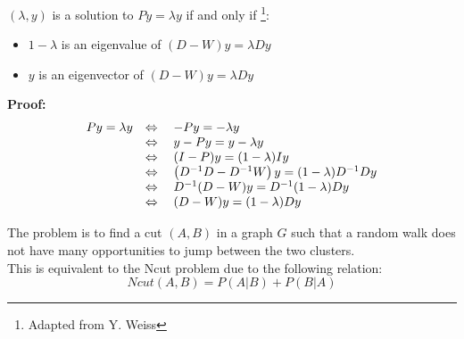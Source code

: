 \begin{thm} $(\lambda, y)$ is a solution to $Py = \lambda y$ if and only if \footnote{Adapted from Y. Weiss}:
	\begin{itemize}
		\item $1-\lambda$ is an eigenvalue of $(D-W)y = \lambda D y$
		\item $y$ is an eigenvector of $(D-W)y = \lambda Dy$
	\end{itemize} 
	\textbf{Proof:}
	$$\begin{array} { l l } { P y = \lambda y } & { \Leftrightarrow \quad - P y = - \lambda y } \\
	{ } & { \Leftrightarrow \quad y - P y = y - \lambda y } \\
	{ } & { \Leftrightarrow \quad ( I - P ) y = ( 1 - \lambda ) I y } \\
	{ } & { \Leftrightarrow \quad \left( D ^ { - 1 } D - D ^ { - 1 } W \right) y = ( 1 - \lambda ) D ^ { - 1 } D y } \\
	{ } & { \Leftrightarrow \quad D ^ { - 1 } ( D - W ) y = D ^ { - 1 } ( 1 - \lambda ) D y } \\
	{ } & { \Leftrightarrow \quad ( D - W ) y = ( 1 - \lambda ) D y } \end{array}$$
\end{thm}
The problem is to find a cut $(A,B)$ in a graph $G$ such that a random walk does not have many opportunities to jump between the two clusters.\\
This is equivalent to the Ncut problem due to the following relation:
$$Ncut(A,B) = P(A|B) + P(B|A)$$
